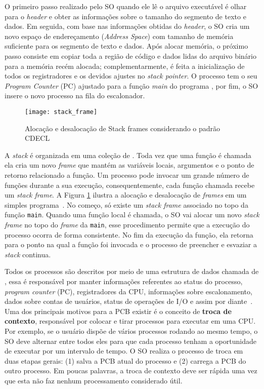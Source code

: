 O primeiro passo realizado pelo SO quando ele lê o arquivo executável é olhar
para o \emph{header} e obter as informações sobre o tamanho do segmento de
texto e dados. Em seguida, com base nas informações obtidas do \emph{header}, o
SO cria um novo espaço de endereçamento (\emph{Address Space}) com tamanho de
memória suficiente para os segmento de texto e dados. Após alocar memória, o
próximo passo consiste em copiar toda a região de código e dados lidas do
arquivo binário para a memória recém alocada; complementarmente, é feita a
inicialização de todos os registradores e os devidos ajustes no \emph{stack
pointer}. O processo tem o seu \emph{Program Counter} (PC) ajustado para a
função \emph{main} do programa \citep{patterson}, por fim, o SO insere o novo
processo na fila do escalonador.

\begin{figure}[!h]
  \centering
  \texttt{[image: stack\_frame]}
  \caption{Alocação e desalocação de Stack frames considerando o padrão CDECL~\citep{patterson}}
  \label{fig:stack_frames} 
\end{figure}


A \emph{stack} é organizada em uma coleção de . Toda
vez que uma função é chamada ela cria um novo \emph{frame} que mantém as
variáveis locais, argumentos e o ponto de retorno relacionado a função. Um
processo pode invocar um grande número de funções durante a sua execução,
consequentemente, cada função chamada recebe um \emph{stack frame}. A Figura
\ref{fig:stack_frames} ilustra a alocação e desalocação de \textit{frames} em um simples
programa~\citep{gdb}. No começo, só existe um \emph{stack frame} associado no
topo da função \texttt{main}. Quando uma função local é chamada, o SO vai
alocar um novo \emph{stack frame} no topo do \emph{frame} da \texttt{main},
esse procedimento permite que a execução do processo ocorra de forma
consistente. No fim da execução da função, ela retorna para o ponto na qual a
função foi invocada e o processo de preencher e esvaziar a \emph{stack}
continua.

Todos os processos são descritos por meio de uma estrutura de dados chamada de
, essa é responsável por manter
informações referentes ao status do processo, \emph{program counter} (PC),
registradores da CPU, informações sobre escalonamento, dados sobre contas de
usuários, status de operações de I/O e assim por diante~\citep{silberschatz}.
Uma dos principais motivos para a PCB existir é o conceito de \textbf{troca de
contexto}, responsável por colocar e tirar processos para executar em uma CPU.
Por exemplo, se o usuário dispõe de vários processos rodando ao mesmo tempo, o
SO deve alternar entre todos eles para que cada processo tenham a oportunidade
de executar por um intervalo de tempo. O SO realiza o processo de troca em duas
etapas gerais: (1) salva a PCB atual do processo e (2) carrega a PCB do outro
processo. Em poucas palavras, a troca de contexto deve ser rápida uma vez
que esta não faz nenhum processamento considerado útil.

